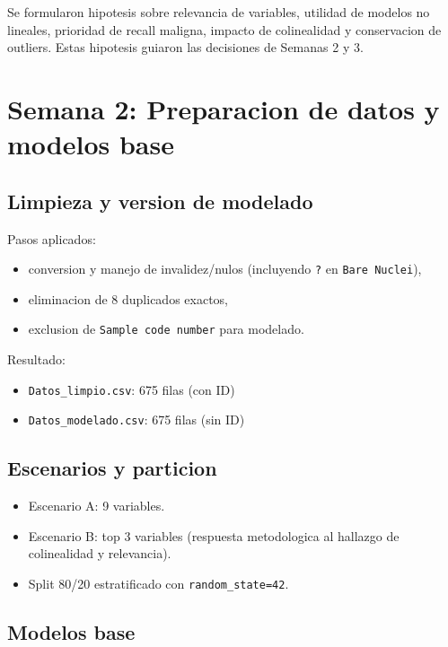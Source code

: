 \documentclass[11pt,a4paper]{article}
\begin{document}
Se formularon hipotesis sobre relevancia de variables, utilidad de modelos no lineales, prioridad de recall maligna, impacto de colinealidad y conservacion de outliers. Estas hipotesis guiaron las decisiones de Semanas 2 y 3.

\section{Semana 2: Preparacion de datos y modelos base}

\subsection{Limpieza y version de modelado}

Pasos aplicados:

\begin{itemize}[leftmargin=1.2cm]
\item conversion y manejo de invalidez/nulos (incluyendo \texttt{?} en \texttt{Bare Nuclei}),
\item eliminacion de 8 duplicados exactos,
\item exclusion de \texttt{Sample code number} para modelado.
\end{itemize}

Resultado:

\begin{itemize}[leftmargin=1.2cm]
\item \texttt{Datos\_limpio.csv}: 675 filas (con ID)
\item \texttt{Datos\_modelado.csv}: 675 filas (sin ID)
\end{itemize}

\subsection{Escenarios y particion}

\begin{itemize}[leftmargin=1.2cm]
\item Escenario A: 9 variables.
\item Escenario B: top 3 variables (respuesta metodologica al hallazgo de colinealidad y relevancia).
\item Split 80/20 estratificado con \texttt{random\_state=42}.
\end{itemize}

\subsection{Modelos base}
\end{document}
